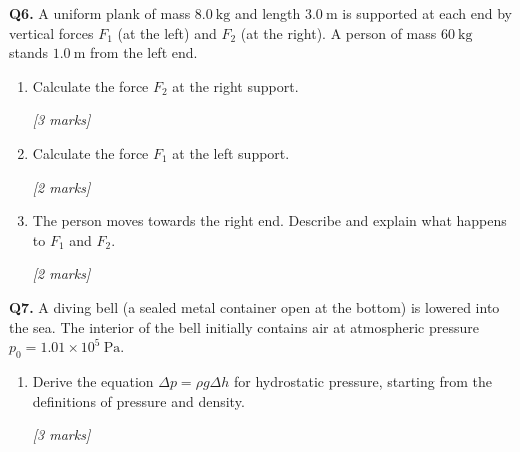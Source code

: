 \begin{tcolorbox}[colback=white, colframe=midblue, breakable]

\begin{minipage}{\linewidth}
\textbf{Q6.} A uniform plank of mass $8.0\ \text{kg}$ and length $3.0\ \text{m}$ is supported at each end by vertical forces $F_1$ (at the left) and $F_2$ (at the right). A person of mass $60\ \text{kg}$ stands $1.0\ \text{m}$ from the left end.
\end{minipage}

\begin{enumerate}[label=(\alph*)]
  \item \begin{minipage}[t]{\linewidth}
  Calculate the force $F_2$ at the right support.
  \par\hfill\textit{[3 marks]}
  \vspace{4cm}
  \end{minipage}

  \item \begin{minipage}[t]{\linewidth}
  Calculate the force $F_1$ at the left support.
  \par\hfill\textit{[2 marks]}
  \vspace{3cm}
  \end{minipage}

  \item \begin{minipage}[t]{\linewidth}
  The person moves towards the right end. Describe and explain what happens to $F_1$ and $F_2$.
  \par\hfill\textit{[2 marks]}
  \vspace{3.5cm}
  \end{minipage}
\end{enumerate}

\begin{minipage}{\linewidth}
\textbf{Q7.} A diving bell (a sealed metal container open at the bottom) is lowered into the sea. The interior of the bell initially contains air at atmospheric pressure $p_0 = 1.01 \times 10^5\ \text{Pa}$.
\end{minipage}

\begin{enumerate}[label=(\alph*)]
  \item \begin{minipage}[t]{\linewidth}
  Derive the equation $\Delta p = \rho g \Delta h$ for hydrostatic pressure, starting from the definitions of pressure and density.
  \par\hfill\textit{[3 marks]}
  \vspace{5cm}
  \end{minipage}


\end{enumerate}
\end{tcolorbox}
